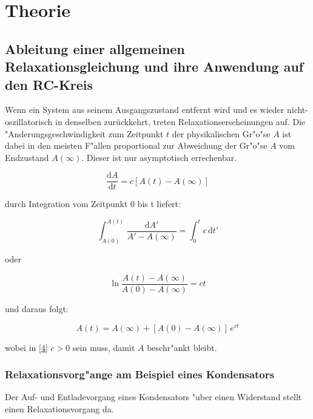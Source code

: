 \documentclass{scrartcl}
\begin{document}
	
	\section{Theorie}

		\subsection{Ableitung einer allgemeinen Relaxationsgleichung und ihre Anwendung auf den RC-Kreis}

			Wenn ein System aus seinem Ausgangszustand entfernt wird und es wieder nicht-oszillatorisch in denselben zurückkehrt, treten Relaxationserscheinungen auf. Die "Anderungsgeschwindigkeit zum Zeitpunkt $t$ der physikalischen Gr"o"se $A$ ist dabei in den meisten F"allen proportional zur Abweichung der Gr"o"se $A$ vom Endzustand $A(\infty)$. Dieser ist nur asymptotisch errechenbar.

			\begin{equation}
				\frac{\mathrm{d} A}{\mathrm{d} t} = c \left[ A(t) - A(\infty) \right] \label{1}
			\end{equation}

			durch Integration vom Zeitpunkt 0 bis t liefert:

			\begin{equation}
				\int_{A(0)}^{A(t)} \! \frac{\mathrm{d} A'}{A' - A(\infty)} = \int_0^t \! c \, \mathrm{d} t' \label{2}
			\end{equation}

			oder

			\begin{equation}
				\ln{\frac{A(t) - A(\infty)}{A(0) - A(\infty)}} = c t \label{3}
			\end{equation}

			und daraus folgt:

			\begin{equation}
				A(t) = A(\infty) + \left[ A(0) - A(\infty) \right] \, e^{c t} \label{4}
			\end{equation}

			wobei in \ref{4} $c>0$ sein muss, damit $A$ beschr"ankt bleibt.

			\subsubsection{Relaxationsvorg"ange am Beispiel eines Kondensators}

				Der Auf- und Entladevorgang eines Kondensators "uber einen Widerstand stellt einen Relaxationsvorgang da.
\end{document}
